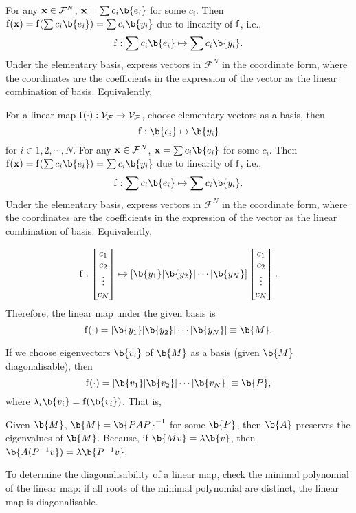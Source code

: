For any $\mathbf{x} \in \mathcal{F}^N$,  $\x =\sum c_i\b{e_i}$ for some $c_i$. Then 
$\f(\x) = \f(\sum c_i\b{e_i}) = \sum c_i\b{y_i}$ 
due to linearity of $\operatorname{f}$, i.e.,
$$\f: \sum c_i\b{e_i} \mapsto \sum c_i\b{y_i}.$$
Under the elementary basis, express vectors in $\mathcal{F}^N$ in the  coordinate form, where the coordinates are the coefficients in the expression of the vector as the linear combination of basis. Equivalently,




For a linear map $\operatorname{f}(\cdot): \mathcal{V}_{\mathcal{F}} \to \mathcal{V}_{\mathcal{F}}$, choose elementary vectors as a basis, then 
$$\f: \b{e_i} \mapsto \b{y_i}$$
for $i \in {1,2,\cdots,N}$. 
For any $\mathbf{x} \in \mathcal{F}^N$,  $\x =\sum c_i\b{e_i}$ for some $c_i$. Then 
$\f(\x) = \f(\sum c_i\b{e_i}) = \sum c_i\b{y_i}$ 
due to linearity of $\operatorname{f}$, i.e.,
$$\f: \sum c_i\b{e_i} \mapsto \sum c_i\b{y_i}.$$
Under the elementary basis, express vectors in $\mathcal{F}^N$ in the  coordinate form, where the coordinates are the coefficients in the expression of the vector as the linear combination of basis. Equivalently,

$$\f: 
\begin{bmatrix}
c_1 \\
c_2 \\
\vdots \\
c_N
\end{bmatrix} 
\mapsto \left[ \b{y_1} | \b{y_2}| \cdots |\b{y_N} \right] \begin{bmatrix}
c_1 \\
c_2 \\
\vdots \\
c_N
\end{bmatrix}.$$
Therefore, the linear map under the given basis is 
$$\f(\cdot) = \left[ \b{y_1} | \b{y_2}| \cdots |\b{y_N} \right] \equiv \b{M}.$$ 

If we choose eigenvectors $\b{v_i}$ of $\b{M}$ as a basis (given $\b{M}$ diagonalisable), then 
$$\f(\cdot) = \left[ \b{v_1} | \b{v_2}| \cdots |\b{v_N} \right] \equiv \b{P},$$
where $ \lambda_i \b{v_i} = \f(\b{v_i})$. 
That is, 



Given $\b{M}$, $\b{M} = \b{PAP}^{-1}$ for some $\b{P}$, then $\b{A}$ preserves the eigenvalues of $\b{M}$. Because, if  $\b{Mv} = \lambda \b{v}$, then 
$\b{A(P^{-1}v}) = \lambda \b{P^{-1}v}$.

To determine the diagonalisability of a linear map, check the minimal polynomial of the linear map: if all roots of the minimal polynomial are distinct, the linear map is diagonalisable.



